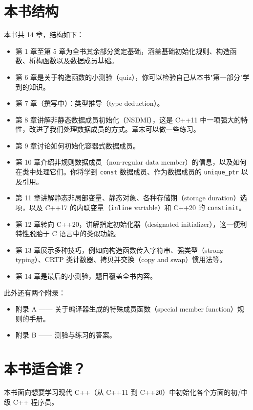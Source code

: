 \section{本书结构}

本书共 14 章，结构如下：

\begin{itemize}
\item 第 1 章至第 5 章为全书其余部分奠定基础，涵盖基础初始化规则、构造函数、析构函数以及数据成员基础。
\item 第 6 章是关于构造函数的小测验（quiz），你可以检验自己从本书"第一部分"学到的知识。
\item 第 7 章（撰写中）：类型推导（type deduction）。
\item 第 8 章讲解非静态数据成员初始化（NSDMI），这是 C++11 中一项强大的特性，改进了我们处理数据成员的方式。章末可以做一些练习。
\item 第 9 章讨论如何初始化容器式数据成员。
\item 第 10 章介绍非规则数据成员（non-regular data member）的信息，以及如何在类中处理它们。你将学到 \texttt{const} 数据成员、作为数据成员的 \texttt{unique\_ptr} 以及引用。
\item 第 11 章讲解静态非局部变量、静态对象、各种存储期（storage duration）选项，以及 C++17 的内联变量（\texttt{inline} variable）和 C++20 的 \texttt{constinit}。
\item 第 12 章转向 C++20，讲解指定初始化器（designated initializer），这一便利特性脱胎于 C 语言中的类似功能。
\item 第 13 章展示多种技巧，例如向构造函数传入字符串、强类型（strong typing）、CRTP 类计数器、拷贝并交换（copy and swap）惯用法等。
\item 第 14 章是最后的小测验，题目覆盖全书内容。
\end{itemize}

此外还有两个附录：

\begin{itemize}
\item 附录 A —— 关于编译器生成的特殊成员函数（special member function）规则的手册。
\item 附录 B —— 测验与练习的答案。
\end{itemize}

\section{本书适合谁？}

本书面向想要学习现代 C++（从 C++11 到 C++20）中初始化各个方面的初/中级 C++ 程序员。

